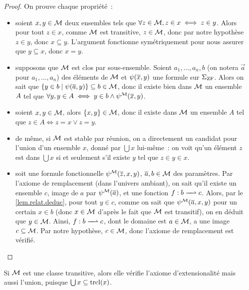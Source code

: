 \begin{proof}
  On prouve chaque propriété~:
  \begin{itemize}
  \item soient $x,y \in \mathcal{M}$ deux ensembles tels que
    $\forall z \in \mathcal{M}, z \in x \iff z \in y$. Alors pour tout $z \in x$,
    comme $\mathcal{M}$ est transitive, $z \in \mathcal{M}$, donc par notre hypothèse
    $z \in y$, donc $x \subseteq y$. L'argument fonctionne symétriquement pour
    nous assurer que $y \subseteq x$, donc $x = y$.
  \item supposons que $\mathcal{M}$ est clos par sous-ensemble. Soient
    $a_1,\ldots,a_n,b$ (on notera $\vec a$ pour $a_1,\ldots,a_n$)
    des éléments de $\mathcal{M}$ et $\psi(\overline{x},y)$ une formule sur
    $\Sigma_{\operatorname{ZF}}$. Alors on sait que
    $\left\{ y \in b \;\middle\vert\; \psi(\overline{a},y) \right\} \subseteq b \in \mathcal{M}$,
    donc il existe bien dans $\mathcal{M}$ un ensemble $A$ tel que
    $\forall y, y \in A \iff y \in b \land \psi^{\mathcal{M}}(\overline{x},y)$.
  \item soient $x,y \in \mathcal{M}$, alors $\{x,y\} \in \mathcal{M}$, donc il existe dans
    $\mathcal{M}$ un ensemble $A$ tel que $z \in A \iff z = x \lor z = y$.
  \item de même, si $\mathcal{M}$ est stable par réunion, on a directement un
    candidat pour l'union d'un ensemble $x$, donné par $\bigcup x$
    lui-même~: on voit qu'un élément $z$ est dans $\bigcup x$ si et seulement
    s'il existe $y$ tel que $z \in y \in x$.
  \item soit une formule fonctionnelle $\psi^{\mathcal{M}}(\overline{z},x,y)$,
    $\overline{a},b \in \mathcal{M}$ des paramètres. Par l'axiome de remplacement (dans
    l'univers ambiant), on sait qu'il existe un ensemble $c$, image de $a$
    par $\psi^{\mathcal{M}}(\overline{a})$, et une fonction $\makeFunNamePartial{f}{b}{c}$.
    Alors, par le \cref{lem.relat.deduc}, pour tout $y \in c$, comme on sait que
    $\psi^{\mathcal{M}}(\overline{a},x,y)$ pour un certain $x \in b$ (donc $x \in \mathcal{M}$
    d'après le fait que $\mathcal{M}$ est transitif), on en déduit que $y\in\mathcal{M}$.
    Ainsi, $\makeFunNamePartial{f}{b}{c}$, dont le domaine est $a \in \mathcal{M}$, a
    une image $c \subseteq \mathcal{M}$. Par notre hypothèse, $c \in \mathcal{M}$, donc
    l'axiome de remplacement est vérifié.\qedhere
  \end{itemize}
\end{proof}

\begin{remark}
  Si $\mathcal{M}$ est une classe transitive, alors elle vérifie l'axiome
  d'extensionalité mais aussi l'union, puisque $\bigcup x \subseteq \operatorname{trcl}(x)$.
\end{remark}

